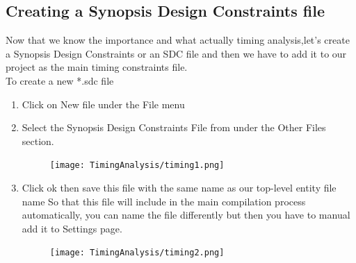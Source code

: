 \documentclass[12pt,singleside,a4paper]{article}
\begin{document}
\subsection{Creating a Synopsis Design Constraints file}
Now that we know the importance and what actually timing analysis,let’s create a Synopsis Design Constraints or an SDC file and then we have to add it to our project as the main timing constraints file. \\
To create a new *.sdc file
\begin{enumerate}
    \item Click on New file under the File menu
    \item Select the Synopsis Design Constraints File from under the Other Files section.
        \begin{figure}[H]
            \centering
            \texttt{[image: TimingAnalysis/timing1.png]}
        \end{figure}
        
     \item Click ok then save this file with the same name as our top-level entity file name 
     So that this file will include in the main compilation process automatically, you can name the file differently but then you have to manual add it to Settings page.
     \begin{figure}[H]
            \centering
            \texttt{[image: TimingAnalysis/timing2.png]}
        \end{figure}
\end{enumerate}
\end{document}
